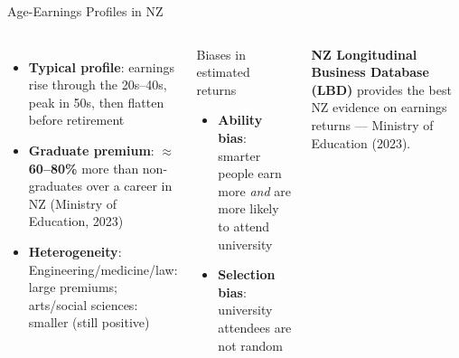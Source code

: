 \documentclass[aspectratio=169, 12pt]{beamer}
\begin{document}
\begin{frame}{Age-Earnings Profiles in NZ}
  \begin{columns}
      \footnotesize
      \begin{itemize}
        \item \textbf{Typical profile}: earnings rise through the 20s--40s, peak in 50s,
              then flatten before retirement
        \item \textbf{Graduate premium}: $\approx$\textbf{60--80\%} more than non-graduates
              over a career in NZ (Ministry of Education, 2023)
        \item \textbf{Heterogeneity}: Engineering/medicine/law: large premiums; arts/social
              sciences: smaller (still positive)
      \end{itemize}
      \begin{alertblock}{Biases in estimated returns}
        \footnotesize
        \begin{itemize}
          \item \textbf{Ability bias}: smarter people earn more \emph{and} are more likely
                to attend university
          \item \textbf{Selection bias}: university attendees are not random
        \end{itemize}
      \end{alertblock}
      \vspace{0.2em}
      \footnotesize \textbf{NZ Longitudinal Business Database (LBD)} provides the best NZ
      evidence on earnings returns --- Ministry of Education (2023).
  \end{columns}
\end{frame}
\end{document}
